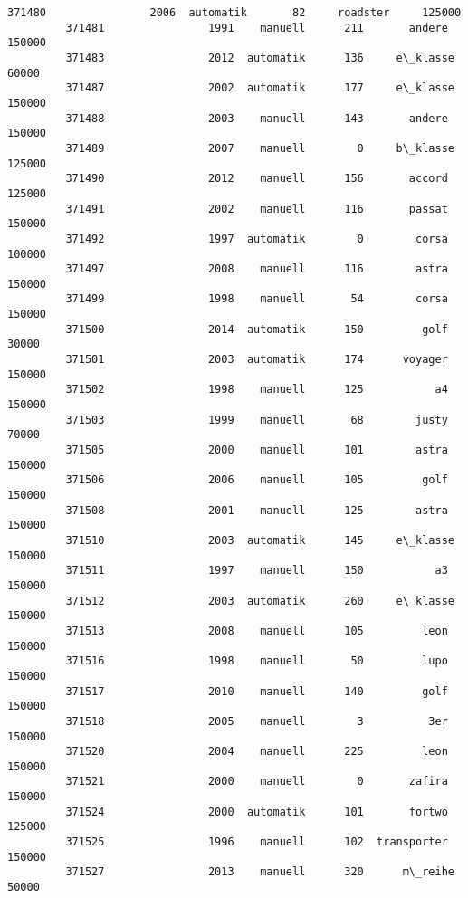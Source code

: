 \documentclass[11pt]{article}
\begin{document}
\begin{Verbatim}[commandchars=\\\{\}]
         371480                2006  automatik       82     roadster     125000   
         371481                1991    manuell      211       andere     150000   
         371483                2012  automatik      136     e\_klasse      60000   
         371487                2002  automatik      177     e\_klasse     150000   
         371488                2003    manuell      143       andere     150000   
         371489                2007    manuell        0     b\_klasse     125000   
         371490                2012    manuell      156       accord     125000   
         371491                2002    manuell      116       passat     150000   
         371492                1997  automatik        0        corsa     100000   
         371497                2008    manuell      116        astra     150000   
         371499                1998    manuell       54        corsa     150000   
         371500                2014  automatik      150         golf      30000   
         371501                2003  automatik      174      voyager     150000   
         371502                1998    manuell      125           a4     150000   
         371503                1999    manuell       68        justy      70000   
         371505                2000    manuell      101        astra     150000   
         371506                2006    manuell      105         golf     150000   
         371508                2001    manuell      125        astra     150000   
         371510                2003  automatik      145     e\_klasse     150000   
         371511                1997    manuell      150           a3     150000   
         371512                2003  automatik      260     e\_klasse     150000   
         371513                2008    manuell      105         leon     150000   
         371516                1998    manuell       50         lupo     150000   
         371517                2010    manuell      140         golf     150000   
         371518                2005    manuell        3          3er     150000   
         371520                2004    manuell      225         leon     150000   
         371521                2000    manuell        0       zafira     150000   
         371524                2000  automatik      101       fortwo     125000   
         371525                1996    manuell      102  transporter     150000   
         371527                2013    manuell      320      m\_reihe      50000   
         

\end{Verbatim}
\end{document}
